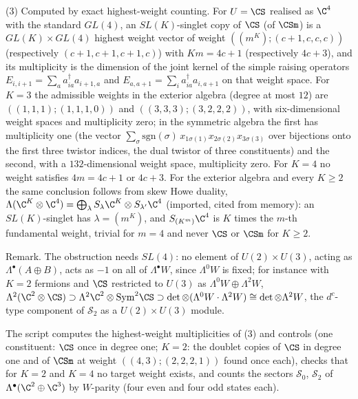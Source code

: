 (3) Computed by exact highest-weight counting. For $U = \CS$ realised as $\C^{4}$ with the standard $GL(4)$, an $SL(K)$-singlet copy of $\CS$ (of $\CSm$) is a $GL(K) \times GL(4)$ highest weight vector of weight $((m^{K}); (c+1, c, c, c))$ (respectively $(c+1, c+1, c+1, c)$) with $Km = 4c + 1$ (respectively $4c + 3$), and its multiplicity is the dimension of the joint kernel of the simple raising operators $E_{i,i+1} = \sum_{a}a^{\dagger}_{ia}a_{i+1,a}$ and $E_{a,a+1} = \sum_{i}a^{\dagger}_{ia}a_{i,a+1}$ on that weight space. For $K = 3$ the admissible weights in the exterior algebra (degree at most $12$) are $((1,1,1);(1,1,1,0))$ and $((3,3,3);(3,2,2,2))$, with six-dimensional weight spaces and multiplicity zero; in the symmetric algebra the first has multiplicity one (the vector $\sum_{\sigma}\mathrm{sgn}(\sigma)\,x_{1\sigma(1)}x_{2\sigma(2)}x_{3\sigma(3)}$ over bijections onto the first three twistor indices, the dual twistor of three constituents) and the second, with a $132$-dimensional weight space, multiplicity zero. For $K = 4$ no weight satisfies $4m = 4c + 1$ or $4c + 3$. For the exterior algebra and every $K \ge 2$ the same conclusion follows from skew Howe duality, $\Lambda(\C^{K}\otimes\C^{4}) = \bigoplus_{\lambda}S_{\lambda}\C^{K}\otimes S_{\lambda'}\C^{4}$ (imported, cited from memory): an $SL(K)$-singlet has $\lambda = (m^{K})$, and $S_{(K^{m})}\C^{4}$ is $K$ times the $m$-th fundamental weight, trivial for $m = 4$ and never $\CS$ or $\CSm$ for $K \ge 2$.

Remark. The obstruction needs $SL(4)$: no element of $U(2) \times U(3)$, acting as $\Lambda^{\bullet}(A \oplus B)$, acts as $-1$ on all of $\Lambda^{\bullet}W$, since $\Lambda^{0}W$ is fixed; for instance with $K = 2$ fermions and $\CS$ restricted to $U(3)$ as $\Lambda^{0}W \oplus \Lambda^{2}W$, $\Lambda^{2}(\C^{2}\otimes\CS) \supset \Lambda^{2}\C^{2}\otimes\mathrm{Sym}^{2}\CS \supset \det\otimes(\Lambda^{0}W\cdot\Lambda^{2}W) \cong \det\otimes\Lambda^{2}W$, the $d^{c}$-type component of $\mathcal{S}_{2}$ as a $U(2)\times U(3)$ module.

The script computes the highest-weight multiplicities of (3) and controls (one constituent: $\CS$ once in degree one; $K = 2$: the doublet copies of $\CS$ in degree one and of $\CSm$ at weight $((4,3);(2,2,2,1))$ found once each), checks that for $K = 2$ and $K = 4$ no target weight exists, and counts the sectors $\mathcal{S}_{0}$, $\mathcal{S}_{2}$ of $\Lambda^{\bullet}(\C^{2}\oplus\C^{3})$ by $W$-parity (four even and four odd states each).
